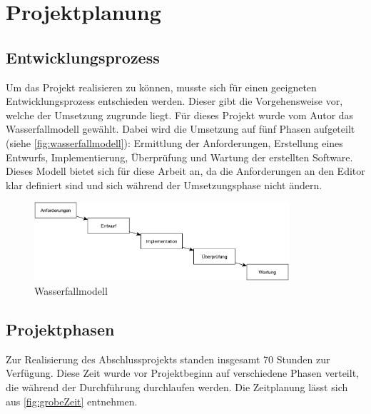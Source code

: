 \section{Projektplanung}

\subsection{Entwicklungsprozess}

Um das Projekt realisieren zu können, musste sich für einen geeigneten Entwicklungsprozess entschieden werden. Dieser gibt die Vorgehensweise vor, welche der Umsetzung zugrunde liegt. Für dieses Projekt wurde vom Autor das Wasserfallmodell gewählt. Dabei wird die Umsetzung auf fünf Phasen aufgeteilt (siehe \autoref{fig:wasserfallmodell}): Ermittlung der Anforderungen,  Erstellung eines Entwurfs, Implementierung, Überprüfung und Wartung der erstellten Software. Dieses Modell bietet sich für diese Arbeit an, da die Anforderungen an den Editor klar definiert sind und sich während der Umsetzungsphase nicht ändern.

\begin{figure}[H]
	\centering
	\includegraphics[height=110px]{../graphic/diagrams/SD_Wasserfallmodell/Wasserfallmodell}
	\caption{Wasserfallmodell}
	\label{fig:wasserfallmodell}
\end{figure}

\subsection{Projektphasen}
\label{Projektphasen}

Zur Realisierung des Abschlussprojekts standen insgesamt 70 Stunden zur Verfügung. Diese Zeit wurde vor Projektbeginn auf verschiedene Phasen verteilt, die während der Durchführung durchlaufen werden. Die Zeitplanung lässt sich aus \autoref{fig:grobeZeit} entnehmen.

